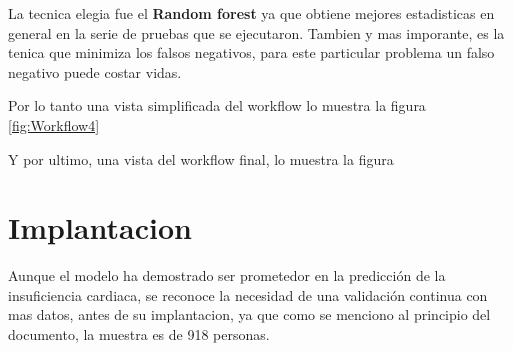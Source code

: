 \documentclass[12pt, letterpaper]{article}
\begin{document}
La tecnica elegia fue el \textbf{Random forest} ya que obtiene mejores estadisticas en general 
en la serie de pruebas que se ejecutaron. Tambien y mas imporante, es la tenica que 
minimiza los falsos negativos, para este particular problema un falso negativo puede costar vidas.

Por lo tanto una vista simplificada del workflow lo muestra la figura \ref{fig:Workflow4}

Y por ultimo, una vista del workflow final, lo muestra la figura

\section{Implantacion}
Aunque el modelo ha demostrado ser prometedor en la predicción de la insuficiencia cardiaca, 
se reconoce la necesidad de una validación continua con mas datos, antes de su implantacion, 
ya que como se menciono al principio del documento, la muestra es de 918 personas. 

\newpage
\printbibliography
\end{document}
